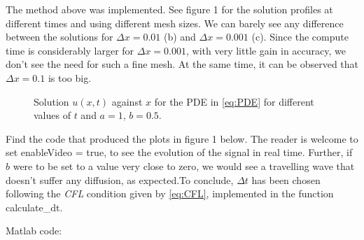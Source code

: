 \begin{questions}
\begin{solution}
The method above was implemented. See figure 1 for the solution profiles at different times and using different mesh sizes. We can barely see any difference between the solutions for $\Delta x=0.01$ (b) and $\Delta x=0.001$ (c). Since the compute time is considerably larger for $\Delta x=0.001$, with very little gain in accuracy, we don't see the need for such a fine mesh. At the same time, it can be observed that $\Delta x = 0.1$ is too big.
\begin{figure}[H]
\centering     %
{}
\hspace{-0.9cm}
\hspace{-0.9cm}
\caption{Solution $u(x,t)$ against $x$ for the PDE in \eqref{eq:PDE} for different values of $t$ and $a=1$, $b=0.5$.}
\end{figure}
Find the code that produced the plots in figure 1 below. The reader is welcome to set \textsf{enableVideo = true}, to see the evolution of the signal in real time. Further, if $b$ were to be set to a value very close to zero, we would see a travelling wave that doesn't suffer any diffusion, as expected.To conclude, $\Delta t$ has been chosen following the \textit{CFL} condition given by \eqref{eq:CFL}, implemented in the function \textsf{calculate\_dt}.

Matlab code:

\end{solution}
\end{questions}